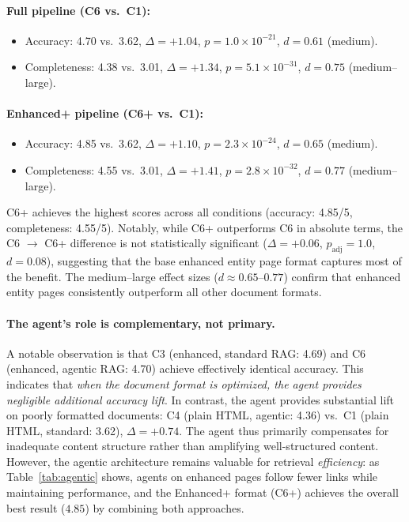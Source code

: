 \documentclass[runningheads]{llncs}
\begin{document}
\paragraph{Full pipeline (C6 vs.\ C1):}
\begin{itemize}
    \item Accuracy: 4.70 vs.\ 3.62, $\Delta = +1.04$,
          $p = 1.0 \times 10^{-21}$, \textbf{$d = 0.61$} (medium).
    \item Completeness: 4.38 vs.\ 3.01, $\Delta = +1.34$,
          $p = 5.1 \times 10^{-31}$, \textbf{$d = 0.75$} (medium--large).
\end{itemize}

\paragraph{Enhanced+ pipeline (C6+ vs.\ C1):}
\begin{itemize}
    \item Accuracy: 4.85 vs.\ 3.62, $\Delta = +1.10$,
          $p = 2.3 \times 10^{-24}$, \textbf{$d = 0.65$} (medium).
    \item Completeness: 4.55 vs.\ 3.01, $\Delta = +1.41$,
          $p = 2.8 \times 10^{-32}$, \textbf{$d = 0.77$} (medium--large).
\end{itemize}

C6+ achieves the highest scores across all conditions (accuracy:
4.85/5, completeness: 4.55/5). Notably, while C6+ outperforms C6 in absolute terms,
the C6 $\rightarrow$ C6+ difference is not statistically significant
($\Delta = +0.06$, $p_\text{adj} = 1.0$, $d = 0.08$), suggesting that
the base enhanced entity page format captures most of the benefit.
The medium--large effect sizes ($d \approx 0.65$--$0.77$) confirm that
enhanced entity pages consistently outperform all other document formats.

\paragraph{The agent's role is complementary, not primary.}
A notable observation is that C3 (enhanced, standard RAG: 4.69) and C6
(enhanced, agentic RAG: 4.70) achieve effectively identical accuracy.
This indicates that \emph{when the document format is optimized, the
agent provides negligible additional accuracy lift}.  In contrast, the
agent provides substantial lift on poorly formatted documents: C4
(plain HTML, agentic: 4.36) vs.\ C1 (plain HTML, standard: 3.62),
$\Delta = +0.74$.  The agent thus primarily compensates for
inadequate content structure rather than amplifying well-structured content.
However, the agentic architecture remains valuable for retrieval
\emph{efficiency}: as Table~\ref{tab:agentic} shows, agents on enhanced
pages follow fewer links while maintaining performance, and the Enhanced+
format (C6+) achieves the overall best result ($4.85$) by combining both
approaches.
\end{document}
